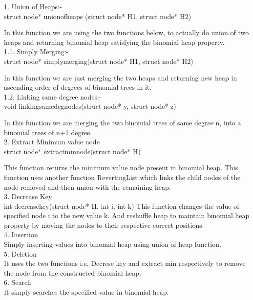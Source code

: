 1. Union of Heaps:-\\
	struct node* unionofheaps (struct node* H1, struct node* H2) 
	
	In this function we are using the two functions below, to actually do union of two heaps  and returning binomial heap satisfying the binomial heap property.\\

1.1. Simply Merging:- 
	\\struct node* simplymerging(struct node* H1, struct node* H2) 
	
	In this function we are just merging the two heaps and returning new heap in ascending order of degrees of binomial trees in it.\\
	
	
1.2. Linking same degree nodes:-
	\\void linkingsamedegnodes(struct node* y, struct node* z) 
	
	In this function we are merging the two binomial trees of same degree n, into a binomial trees of n+1 degree.\\
	
2. Extract Minimum value node
	\\struct node* extractminnode(struct node* H)
	
	This function returns the minimum value node present in binomial heap.
	This function uses another function RevertingList which links the child nodes of the node removed and then union with the remaining heap. \\
	
3. Decrease Key
	\\int decreasekey(struct node* H, int i, int k) 
	This function changes the value of specified node i to the new value k. And reshuffle heap to maintain binomial heap property by moving the nodes to their respective correct positions.\\

	
4. Insertion
	\\Simply inserting values into binomial heap using union of heap function.\\
	
5. Deletion
	\\It uses the two functions i.e. Decrese key and extract min respectively to remove the node from the constructed binomial heap.\\
	
6. Search
	\\It simply searches the specified value in binomial heap.\\

